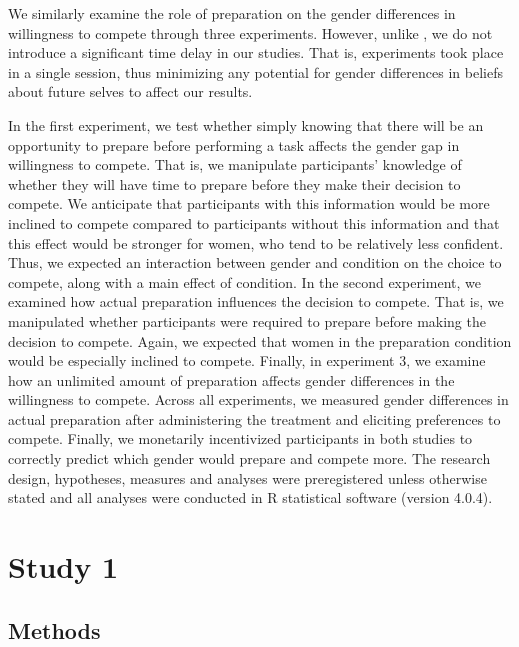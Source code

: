 \documentclass[a4paper, nobind]{templates/ociamthesis}
\begin{document}
We similarly examine the role of preparation on the gender differences in willingness to compete through three experiments. However, unlike \textcite{Charness2021}, we do not introduce a significant time delay in our studies. That is, experiments took place in a single session, thus minimizing any potential for gender differences in beliefs about future selves to affect our results.

In the first experiment, we test whether simply knowing that there will be an opportunity to prepare before performing a task affects the gender gap in willingness to compete. That is, we manipulate participants' knowledge of whether they will have time to prepare before they make their decision to compete. We anticipate that participants with this information would be more inclined to compete compared to participants without this information and that this effect would be stronger for women, who tend to be relatively less confident. Thus, we expected an interaction between gender and condition on the choice to compete, along with a main effect of condition. In the second experiment, we examined how actual preparation influences the decision to compete. That is, we manipulated whether participants were required to prepare before making the decision to compete. Again, we expected that women in the preparation condition would be especially inclined to compete. Finally, in experiment 3, we examine how an unlimited amount of preparation affects gender differences in the willingness to compete. Across all experiments, we measured gender differences in actual preparation after administering the treatment and eliciting preferences to compete. Finally, we monetarily incentivized participants in both studies to correctly predict which gender would prepare and compete more. The research design, hypotheses, measures and analyses were preregistered unless otherwise stated and all analyses were conducted in R statistical software (version 4.0.4).

\hypertarget{study-1}{%
\section{Study 1}\label{study-1}}

\hypertarget{methods}{%
\subsection{Methods}\label{methods}}
\end{document}
